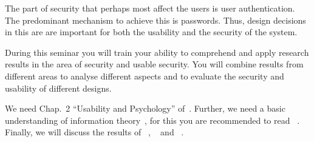 The part of security that perhaps most affect the users is user authentication.
The predominant mechanism to achieve this is passwords.
Thus, design decisions in this are are important for both the usability and the 
security of the system.

During this seminar you will train your ability to comprehend and apply 
research results in the area of security and usable security.
You will combine results from different areas to analyse different aspects and 
to evaluate the security and usability of different designs.

We need Chap.~2 \enquote{Usability and Psychology} of~\cite{Anderson2008sea}.
Further, we need a basic understanding of information 
theory~\cite{Shannon1948amt}, for this you are recommended to read 
~\cite{Ueltschi2013se}.
Finally, we will discuss the results of 
~\cite{Komanduri2011opa},
~\cite{kelley2012guess} and 
~\cite{Komanduri2014can}.
